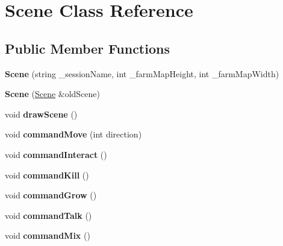 \hypertarget{class_scene}{}\section{Scene Class Reference}
\label{class_scene}
\subsection*{Public Member Functions}
\begin{DoxyCompactItemize}
\item 
\mbox{\label{class_scene_a1d70584e5f6fabcbfe0208eb31f37a4f}} 
{\bfseries Scene} (string \+\_\+session\+Name, int \+\_\+farm\+Map\+Height, int \+\_\+farm\+Map\+Width)
\item 
\mbox{\label{class_scene_a1d7356a93de9321eae314ea9589633f1}} 
{\bfseries Scene} (\mbox{\hyperlink{class_scene}{Scene}} \&old\+Scene)
\item 
\mbox{\label{class_scene_ae27f4327ca363cc9cad8ab553504e2d5}} 
void {\bfseries draw\+Scene} ()
\item 
\mbox{\label{class_scene_a193ee0d6889efcf054f3c174ebd03df2}} 
void {\bfseries command\+Move} (int direction)
\item 
\mbox{\label{class_scene_aeafd082dcfa90145da810adf0e4c57cd}} 
void {\bfseries command\+Interact} ()
\item 
\mbox{\label{class_scene_a8e034351318f61c5a5b6651dede56ca8}} 
void {\bfseries command\+Kill} ()
\item 
\mbox{\label{class_scene_a7783c0e7248729d9bca45bbe198d9d93}} 
void {\bfseries command\+Grow} ()
\item 
\mbox{\label{class_scene_af39e0d00fc0690682fd573d7a9d63337}} 
void {\bfseries command\+Talk} ()
\item 
\mbox{\label{class_scene_a76e2ae95bb5c3fa8122a6e3bd9181925}} 
void {\bfseries command\+Mix} ()
\end{DoxyCompactItemize}
